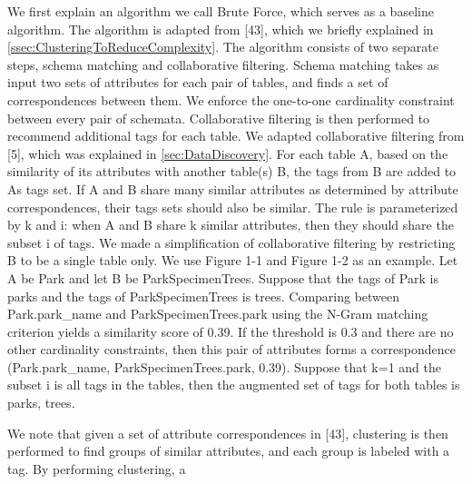 We first explain an algorithm we call Brute Force, which serves as a baseline algorithm. The algorithm is adapted from \cite{Smith2011Unity}[43], which we briefly explained in \autoref{ssec:ClusteringToReduceComplexity}. The algorithm consists of two separate steps, schema matching and collaborative filtering. Schema matching takes as input two sets of attributes for each pair of tables, and finds a set of correspondences between them. We enforce the one-to-one cardinality constraint between every pair of schemata. Collaborative filtering is then performed to recommend additional tags for each table. We adapted collaborative filtering from \cite{conf/esws/EllefiBDT16}[5], which was explained in \autoref{sec:DataDiscovery}. For each table A, based on the similarity of its attributes with another table(s) B, the tags from B are added to As tags set. If A and B share many similar attributes as determined by attribute correspondences, their tags sets should also be similar. The rule is parameterized by k and i: when A and B share k similar attributes, then they should share the subset i of tags. We made a simplification of collaborative filtering by restricting B to be a single table only.
We use Figure 1-1 and Figure 1-2 as an example. Let A be Park and let B be ParkSpecimenTrees. Suppose that the tags of Park is {parks} and the tags of ParkSpecimenTrees is {trees}. Comparing between Park.park\_name and ParkSpecimenTrees.park using the N-Gram matching criterion yields a similarity score of 0.39. If the threshold is 0.3 and there are no other cardinality constraints, then this pair of attributes forms a correspondence (Park.park\_name, ParkSpecimenTrees.park, 0.39). Suppose that k=1 and the subset i is all tags in the tables, then the augmented set of tags for both tables is {parks, trees}.


We note that given a set of attribute correspondences in \cite{Smith2011Unity}[43], clustering is then performed to find groups of similar attributes, and each group is labeled with a tag. By performing clustering, a

